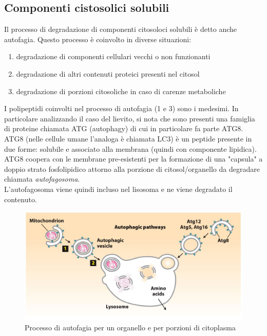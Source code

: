     \subsection{Componenti cistosolici solubili}
        Il processo di degradazione di componenti citosoloci solubili è detto anche autofagia. Questo processo è coinvolto in diverse situazioni: 
        \begin{enumerate}
            \item degradazione di componenti cellulari vecchi o non funzionanti
            \item degradazione di altri contenuti proteici presenti nel citosol
            \item degradazione di porzioni citosoliche in caso di carenze metaboliche
        \end{enumerate}
        I polipeptidi coinvolti nel processo di autofagia (1 e 3) sono i medesimi. In particolare analizzando il caso del lievito, si nota che sono presenti una famiglia di proteine chiamata ATG (autophagy) di cui in particolare fa parte ATG8. 
        ATG8 (nelle cellule umane l'analoga è chiamata LC3) è un peptide presente in due forme: solubile e associato alla membrana (quindi con componente lipidica). 
        ATG8 coopera con le membrane pre-esistenti per la formazione di una "capsula" a doppio strato fosfolipidico attorno alla porzione di citosol/organello da degradare chiamata \textit{autofagosoma}.\\
        L'autofagosoma viene quindi incluso nel lisosoma e ne viene degradato il contenuto.
        \begin{figure}[h]
            \centering
            \includegraphics[width=1\textwidth]{images/Autofagia.JPG}
            \caption{\small Processo di autofagia per un organello e per porzioni di citoplasma}
            \label{fig:mesh1}
        \end{figure}
        
\pagebreak
